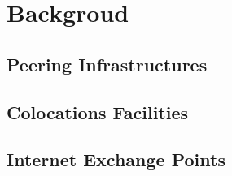 \chapter{Backgroud}\label{cap:background}
\thispagestyle{empty}

	\section{Peering Infrastructures}
	\label{sec:peering-infra}

	\section{Colocations Facilities}
	\label{sec:colos}

	\cite{Giotsas:2015:MPI:2716281.2836122, Kotronis:2017:STC:3131365.3131388}

	\section{Internet Exchange Points}
	\label{sec:ixp}

	\cite{Chatzis:2013, Chatzis:2015:QVO:2717646.2717650, IXPInternetSociety}
	